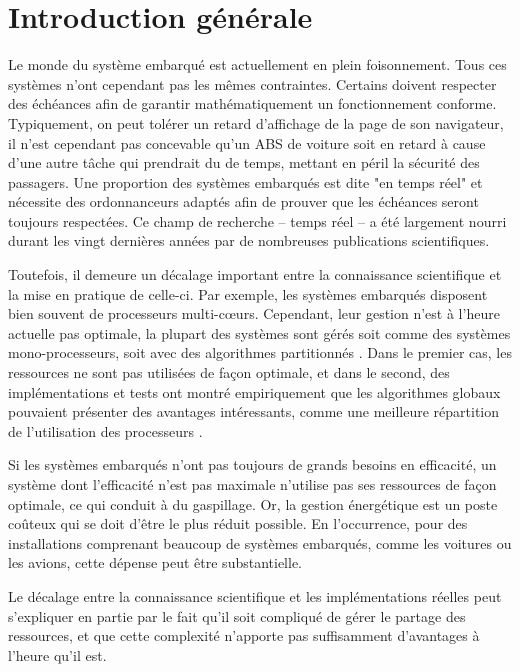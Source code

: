 	
	\section{Introduction générale}
	Le monde du système embarqué est actuellement en plein foisonnement. 
	Tous ces systèmes n'ont cependant pas les mêmes contraintes. 
	Certains doivent respecter des échéances afin de garantir mathématiquement
	un fonctionnement conforme. Typiquement, on peut tolérer 
	un retard d'affichage de la page de son navigateur, il n'est cependant pas 
	concevable qu'un ABS de voiture soit en retard à cause d'une autre tâche 
	qui prendrait du de temps, mettant en péril la sécurité des passagers.
	Une proportion des systèmes embarqués est dite "en temps réel" et nécessite des 
	ordonnanceurs adaptés afin de prouver que les échéances seront toujours respectées.
	Ce champ de recherche -- temps réel -- a été largement nourri durant les vingt dernières années par de nombreuses publications scientifiques. \medskip
	
	Toutefois, il demeure un décalage important entre la connaissance scientifique et 
	la mise en pratique de celle-ci. 
	Par exemple, les systèmes embarqués disposent bien souvent de processeurs multi-c\oe{}urs.
	Cependant, leur gestion n'est à l'heure actuelle pas optimale, la plupart des systèmes sont  
	gérés soit comme des systèmes mono-processeurs, soit avec des algorithmes partitionnés \cite{paolillo_new_nodate}. 
	Dans le premier cas, les ressources ne sont pas utilisées de façon optimale, 
	et dans le second, des implémentations et tests ont montré empiriquement 
	que les algorithmes globaux pouvaient présenter des avantages intéressants, comme 
	une meilleure répartition de l'utilisation des processeurs \cite{baker_analysis_2005}. 
	\medskip	
	
	Si les systèmes embarqués n'ont pas toujours de grands 
	besoins en efficacité, un système dont l'efficacité n'est pas maximale n'utilise pas 
	ses ressources de façon optimale, ce qui conduit à du gaspillage. 
	Or, la gestion énergétique est un poste coûteux qui se doit d'être le plus réduit possible. 
	En l'occurrence, pour des installations comprenant beaucoup de systèmes embarqués, 
	comme les voitures ou les avions, cette dépense peut être substantielle. \medskip
	
	Le décalage entre la connaissance scientifique et les implémentations réelles 
	peut s'expliquer en partie par le fait qu'il soit compliqué de gérer le partage des ressources, 
	et que cette complexité n'apporte pas suffisamment d'avantages à l'heure qu'il est.\medskip
	
